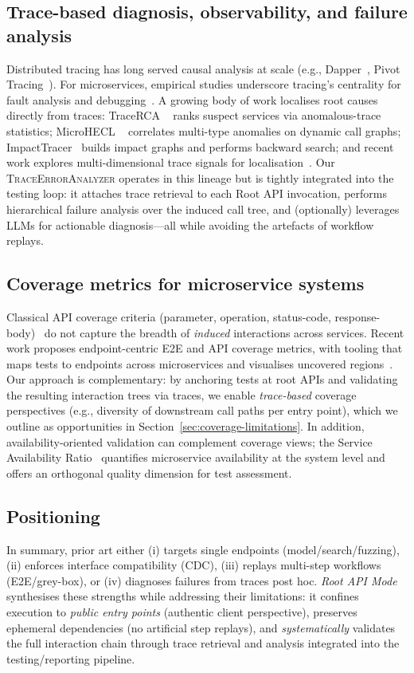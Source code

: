 \documentclass[conference]{IEEEtran}
\begin{document}
\subsection{Trace-based diagnosis, observability, and failure analysis}
Distributed tracing has long served causal analysis at scale (e.g., Dapper~\cite{sigelman2010dapper}, Pivot Tracing~\cite{mace2015pivot}). 
For microservices, empirical studies underscore tracing’s centrality for fault analysis and debugging~\cite{zhou2018microservice}. 
A growing body of work localises root causes directly from traces: TraceRCA ~\cite{li2021tracerca} ranks suspect services via anomalous-trace statistics; MicroHECL ~\cite{liu2021microhecl} correlates multi-type anomalies on dynamic call graphs; ImpactTracer~\cite{xie2023impacttracer} builds impact graphs and performs backward search; and recent work explores multi-dimensional trace signals for localisation~\cite{zhang2024tracecontrast}. 
Our \textsc{TraceErrorAnalyzer} operates in this lineage but is tightly integrated into the testing loop: it attaches trace retrieval to each Root API invocation, performs hierarchical failure analysis over the induced call tree, and (optionally) leverages LLMs for actionable diagnosis---all while avoiding the artefacts of workflow replays.

\subsection{Coverage metrics for microservice systems}
Classical API coverage criteria (parameter, operation, status-code, response-body)~\cite{martin2019restest,arcuri2019restful} do not capture the breadth of \emph{induced} interactions across services. 
Recent work proposes endpoint-centric E2E and API coverage metrics, with tooling that maps tests to endpoints across microservices and visualises uncovered regions~\cite{abdelfattah2024coverage}. 
Our approach is complementary: by anchoring tests at root APIs and validating the resulting interaction trees via traces, we enable \emph{trace-based} coverage perspectives (e.g., diversity of downstream call paths per entry point), which we outline as opportunities in Section~\ref{sec:coverage-limitations}. In addition, availability-oriented validation can complement coverage views; the Service Availability Ratio~\cite{sar} quantifies microservice availability at the system level and offers an orthogonal quality dimension for test assessment.

\subsection{Positioning}
In summary, prior art either (i) targets single endpoints (model/search/fuzzing), (ii) enforces interface compatibility (CDC), (iii) replays multi-step workflows (E2E/grey-box), or (iv) diagnoses failures from traces post hoc. 
\emph{Root API Mode} synthesises these strengths while addressing their limitations: it confines execution to \emph{public entry points} (authentic client perspective), preserves ephemeral dependencies (no artificial step replays), and \emph{systematically} validates the full interaction chain through trace retrieval and analysis integrated into the testing/reporting pipeline.
\end{document}
